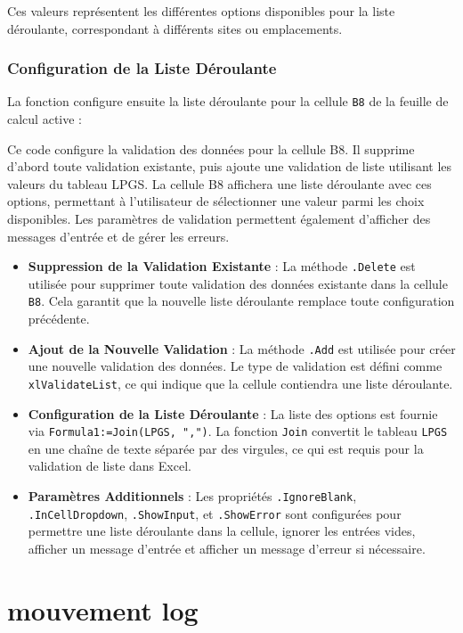 \documentclass[a4paper, oneside, 12pt, final]{extreport}
\begin{document}
Ces valeurs représentent les différentes options disponibles pour la liste déroulante, correspondant à différents sites ou emplacements.

\subsubsection{Configuration de la Liste Déroulante}

La fonction configure ensuite la liste déroulante pour la cellule \texttt{B8} de la feuille de calcul active :


Ce code configure la validation des données pour la cellule B8. Il supprime d'abord toute validation existante, puis ajoute une validation de liste utilisant les valeurs du tableau LPGS. La cellule B8 affichera une liste déroulante avec ces options, permettant à l'utilisateur de sélectionner une valeur parmi les choix disponibles. Les paramètres de validation permettent également d'afficher des messages d'entrée et de gérer les erreurs.

\begin{itemize}
    \item \textbf{Suppression de la Validation Existante} : La méthode \texttt{.Delete} est utilisée pour supprimer toute validation des données existante dans la cellule \texttt{B8}. Cela garantit que la nouvelle liste déroulante remplace toute configuration précédente.
    \item \textbf{Ajout de la Nouvelle Validation} : La méthode \texttt{.Add} est utilisée pour créer une nouvelle validation des données. Le type de validation est défini comme \texttt{xlValidateList}, ce qui indique que la cellule contiendra une liste déroulante.
    \item \textbf{Configuration de la Liste Déroulante} : La liste des options est fournie via \texttt{Formula1:=Join(LPGS, ",")}. La fonction \texttt{Join} convertit le tableau \texttt{LPGS} en une chaîne de texte séparée par des virgules, ce qui est requis pour la validation de liste dans Excel.
    \item \textbf{Paramètres Additionnels} : Les propriétés \texttt{.IgnoreBlank}, \texttt{.InCellDropdown}, \texttt{.ShowInput}, et \texttt{.ShowError} sont configurées pour permettre une liste déroulante dans la cellule, ignorer les entrées vides, afficher un message d'entrée et afficher un message d'erreur si nécessaire.
\end{itemize}
\section{mouvement log}
\end{document}
